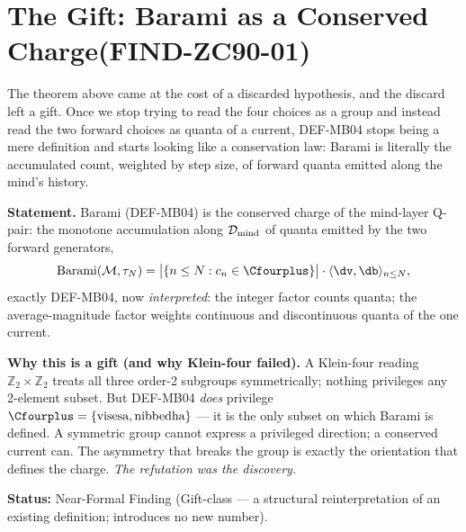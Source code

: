 \documentclass[12pt, a4paper]{article}
\begin{document}
\section{The Gift: Barami as a Conserved Charge\quad(FIND-ZC90-01)}
\label{sec:find-zc90}

The theorem above came at the cost of a discarded hypothesis, and the
discard left a gift. Once we stop trying to read the four choices as a
group and instead read the two forward choices as quanta of a current,
DEF-MB04 stops being a mere definition and starts looking like a
conservation law: Barami is literally the accumulated count, weighted by
step size, of forward quanta emitted along the mind's history.

\begin{giftbox}[title={FIND-ZC90-01: Barami Is a Conserved Charge on the
  Forward 2-Set (Gift)}]

\textbf{Statement.} Barami (DEF-MB04) is the conserved charge of the
mind-layer Q-pair: the monotone accumulation along $\mathcal{D}_{\rm
mind}$ of quanta emitted by the two forward generators,
\[
  \mathrm{Barami}(\mathcal{M},\tau_N)
  =\big|\{n\le N: c_n\in\Cfourplus\}\big|\cdot
   \langle\dv,\db\rangle_{n\le N},
\]
exactly DEF-MB04, now \emph{interpreted}: the integer factor counts
quanta; the average-magnitude factor weights continuous and discontinuous
quanta of the one current.

\textbf{Why this is a gift (and why Klein-four failed).}
A Klein-four reading $\mathbb{Z}_2\times\mathbb{Z}_2$ treats all three order-2
subgroups symmetrically; nothing privileges any 2-element subset. But
DEF-MB04 \emph{does} privilege $\Cfourplus=\{\text{visesa},\text{nibbedha}\}$
--- it is the only subset on which Barami is defined. A symmetric group
cannot express a privileged direction; a conserved current can. The
asymmetry that breaks the group is exactly the orientation that defines
the charge. \emph{The refutation was the discovery.}


\textbf{Status:} Near-Formal Finding (Gift-class --- a structural
reinterpretation of an existing definition; introduces no new number).
\end{giftbox}
\end{document}
